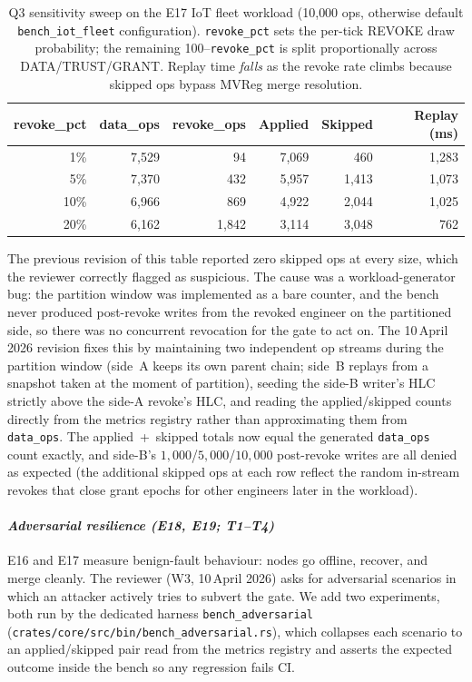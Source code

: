 \documentclass[10pt,journal,compsoc]{IEEEtran}
\begin{document}
\begin{table}[!htbp]
\centering
\caption{Q3 sensitivity sweep on the E17 IoT fleet workload (10{,}000 ops, otherwise default \texttt{bench\_iot\_fleet} configuration). \texttt{revoke\_pct} sets the per-tick \textsc{REVOKE} draw probability; the remaining 100--\texttt{revoke\_pct} is split proportionally across DATA/TRUST/GRANT. Replay time \emph{falls} as the revoke rate climbs because skipped ops bypass MVReg merge resolution.}
\label{tab:q3-revoke-sensitivity}
\footnotesize
\setlength{\tabcolsep}{4pt}
\renewcommand{\arraystretch}{1.1}
\begin{tabular}{@{}rrrrrr@{}}
\toprule
\textbf{revoke\_pct} & \textbf{data\_ops} & \textbf{revoke\_ops} & \textbf{Applied} & \textbf{Skipped} & \textbf{Replay (ms)} \\
\midrule
1\%  & 7{,}529 &     94 & 7{,}069 &     460 & 1{,}283 \\
5\%  & 7{,}370 &    432 & 5{,}957 & 1{,}413 & 1{,}073 \\
10\% & 6{,}966 &    869 & 4{,}922 & 2{,}044 & 1{,}025 \\
20\% & 6{,}162 & 1{,}842 & 3{,}114 & 3{,}048 &    762 \\
\bottomrule
\end{tabular}
\end{table}

The previous revision of this table reported zero skipped ops at every size, which the reviewer correctly flagged as suspicious. The cause was a workload-generator bug: the partition window was implemented as a bare counter, and the bench never produced post-revoke writes from the revoked engineer on the partitioned side, so there was no concurrent revocation for the gate to act on. The 10\,April 2026 revision fixes this by maintaining two independent op streams during the partition window (side~A keeps its own parent chain; side~B replays from a snapshot taken at the moment of partition), seeding the side-B writer's HLC strictly above the side-A revoke's HLC, and reading the applied/skipped counts directly from the metrics registry rather than approximating them from \texttt{data\_ops}. The applied~+~skipped totals now equal the generated \texttt{data\_ops} count exactly, and side-B's $1{,}000$/$5{,}000$/$10{,}000$ post-revoke writes are all denied as expected (the additional skipped ops at each row reflect the random in-stream revokes that close grant epochs for other engineers later in the workload).

\paragraph*{\textbf{\textit{Adversarial resilience (E18, E19; T1--T4)}}}
E16 and E17 measure benign-fault behaviour: nodes go offline, recover, and merge cleanly. The reviewer (W3, 10\,April 2026) asks for adversarial scenarios in which an attacker actively tries to subvert the gate. We add two experiments, both run by the dedicated harness \texttt{bench\_adversarial} (\texttt{crates/core/src/bin/bench\_adversarial.rs}), which collapses each scenario to an applied/skipped pair read from the metrics registry and asserts the expected outcome inside the bench so any regression fails CI.
\end{document}
